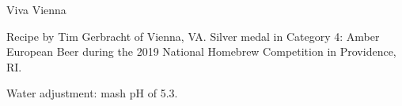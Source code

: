 \begin{recipe}{Viva Vienna} %

\begin{aboutblock}
Recipe by Tim Gerbracht of Vienna, VA. Silver medal in Category 4: Amber European
Beer during the 2019 National Homebrew Competition in Providence, RI. \sourceaha
\end{aboutblock}


\begin{methodandtiming}
 
\begin{mashsteps}
\end{mashsteps}

\begin{fermentationsteps}
\end{fermentationsteps}

\begin{directions}
Water adjustment: mash pH of 5.3.
\end{directions}

\end{methodandtiming}

\recipebreak

\begin{ingredientsblock}

\begin{malts}
\end{malts}

\begin{hops}
\end{hops}


\end{ingredientsblock}

\end{recipe}
